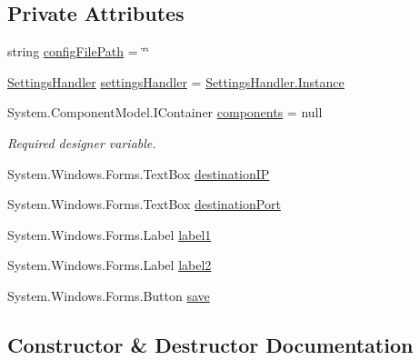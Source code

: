 \subsection*{Private Attributes}
\begin{DoxyCompactItemize}
\item 
string \mbox{\hyperlink{class_cert_complete_1_1_innowi___settings___form_a68af5f8c7ecf4d3385a3457068bf69d6}{config\+File\+Path}} = \char`\"{}\char`\"{}
\item 
\mbox{\hyperlink{class_cert_complete_1_1_settings_handler}{Settings\+Handler}} \mbox{\hyperlink{class_cert_complete_1_1_innowi___settings___form_a4f7871db28d9cb10b221af6548256cc9}{settings\+Handler}} = \mbox{\hyperlink{class_cert_complete_1_1_settings_handler_a7c4f8eb33b1113986d52942f93e52da8}{Settings\+Handler.\+Instance}}
\item 
System.\+Component\+Model.\+I\+Container \mbox{\hyperlink{class_cert_complete_1_1_innowi___settings___form_a575e53ada80b33e65685803803557c2d}{components}} = null
\begin{DoxyCompactList}\small\item\em Required designer variable. \end{DoxyCompactList}\item 
System.\+Windows.\+Forms.\+Text\+Box \mbox{\hyperlink{class_cert_complete_1_1_innowi___settings___form_a75e664ca6e27728ee9c4aea1d0c9c5c7}{destination\+IP}}
\item 
System.\+Windows.\+Forms.\+Text\+Box \mbox{\hyperlink{class_cert_complete_1_1_innowi___settings___form_a5c5c22ec1bac8733e71a13219c3b8e8d}{destination\+Port}}
\item 
System.\+Windows.\+Forms.\+Label \mbox{\hyperlink{class_cert_complete_1_1_innowi___settings___form_a310cb4e3344bf4abf9a1b75371baca60}{label1}}
\item 
System.\+Windows.\+Forms.\+Label \mbox{\hyperlink{class_cert_complete_1_1_innowi___settings___form_af12bd816f3f4c3fc144f7a65cde34601}{label2}}
\item 
System.\+Windows.\+Forms.\+Button \mbox{\hyperlink{class_cert_complete_1_1_innowi___settings___form_a4a4ce8eb82adf19b3add87b341098746}{save}}
\end{DoxyCompactItemize}


\subsection{Constructor \& Destructor Documentation}
\mbox{\label{class_cert_complete_1_1_innowi___settings___form_aa03b9b85e077f22dca0c0755f0a5cae5}} 
